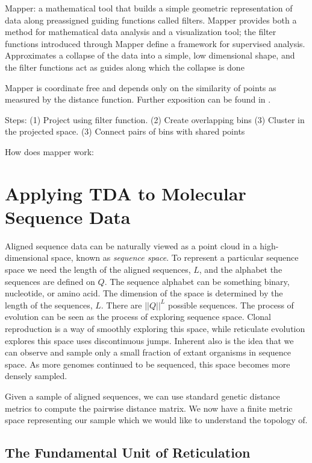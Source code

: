 Mapper: a mathematical tool that builds a simple geometric representation of data along preassigned guiding functions called filters. Mapper provides both a method for mathematical data analysis and a visualization tool; the filter functions introduced through Mapper define a framework for supervised analysis. Approximates a collapse of the data into a simple, low dimensional shape, and the filter functions act as guides along which the collapse is done


Mapper is coordinate free and depends only on the similarity of points as measured by the distance function.
Further exposition can be found in \cite{Lum:2013cz}.



Steps:
(1) Project using filter function.
(2) Create overlapping bins
(3) Cluster in the projected space.
(3) Connect pairs of bins with shared points



How does mapper work:

\section{Applying TDA to Molecular Sequence Data}

Aligned sequence data can be naturally viewed as a point cloud in a high-dimensional space, known as \emph{sequence space}.
To represent a particular sequence space we need the length of the aligned sequences, $L$, and the alphabet the sequences are defined on $Q$.
The sequence alphabet can be something binary, nucleotide, or amino acid.
The dimension of the space is determined by the length of the sequences, $L$.
There are $||Q||^L$ possible sequences.
The process of evolution can be seen as the process of exploring sequence space.
Clonal reproduction is a way of smoothly exploring this space, while reticulate evolution explores this space uses discontinuous jumps.
Inherent also is the idea that we can observe and sample only a small fraction of extant organisms in sequence space.
As more genomes continued to be sequenced, this space becomes more densely sampled.

Given a sample of aligned sequences, we can use standard genetic distance metrics to compute the pairwise distance matrix.
We now have a finite metric space representing our sample which we would like to understand the topology of.

\subsection{The Fundamental Unit of Reticulation}































